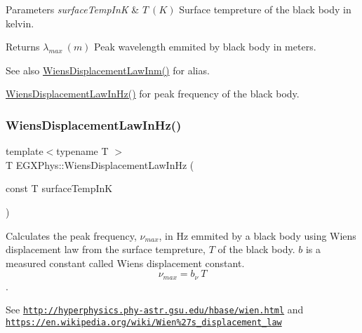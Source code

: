 \begin{DoxyParams}{Parameters}
{\em surface\+Temp\+InK} & $T\ (K)$ Surface tempreture of the black body in kelvin. \\
\hline
\end{DoxyParams}
\begin{DoxyReturn}{Returns}
$\lambda_{max}\ (m)$ Peak wavelength emmited by black body in meters. 
\end{DoxyReturn}
\begin{DoxySeeAlso}{See also}
\mbox{\hyperlink{group___e_g_x_phys-_electrodynamics-_black_body-_wiens_displacement_law_ga126ebb146c31a2371f1d1d001d11c62f}{Wiens\+Displacement\+Law\+Inm()}} for alias. 

\mbox{\hyperlink{group___e_g_x_phys-_electrodynamics-_black_body-_wiens_displacement_law_gaf09ffbc9b7133c16da786c1609ecf689}{Wiens\+Displacement\+Law\+In\+Hz()}} for peak frequency of the black body. 
\end{DoxySeeAlso}
\mbox{\label{group___e_g_x_phys-_electrodynamics-_black_body-_wiens_displacement_law_gaf09ffbc9b7133c16da786c1609ecf689}} 
\subsubsection{\texorpdfstring{Wiens\+Displacement\+Law\+In\+Hz()}{WiensDisplacementLawInHz()}}
{\footnotesize\ttfamily template$<$typename T $>$ \\
T E\+G\+X\+Phys\+::\+Wiens\+Displacement\+Law\+In\+Hz (\begin{DoxyParamCaption}\item[{const T}]{surface\+Temp\+InK }\end{DoxyParamCaption})}



Calculates the peak frequency, $\nu_{max}$, in Hz emmited by a black body using Wien\textquotesingle{}s displacement law from the surface tempreture, $T$ of the black body. $b$ is a measured constant called Wien\textquotesingle{}s displacement constant. \[\nu_{max} = b_\nu\ T \]. 

See \href{http://hyperphysics.phy-astr.gsu.edu/hbase/wien.html}{\tt http\+://hyperphysics.\+phy-\/astr.\+gsu.\+edu/hbase/wien.\+html} and \href{https://en.wikipedia.org/wiki/Wien%27s_displacement_law}{\tt https\+://en.\+wikipedia.\+org/wiki/\+Wien\%27s\+\_\+displacement\+\_\+law}


